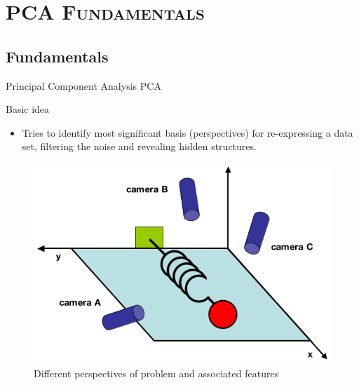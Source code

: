 \documentclass[xcolor=x11names,compress,10pt]{beamer}
\renewcommand{\(}{\begin{columns}}
\renewcommand{\)}{\end{columns}}
\newcommand{\<}[1]{\begin{column}{#1}}
\renewcommand{\>}{\end{column}}
\begin{document}
\section{\scshape PCA Fundamentals}
\subsection{Fundamentals}
\begin{frame}{Principal Component Analysis PCA}
\begin{block}{Basic idea}
\begin{itemize}
	\item Tries to identify most significant basis (perspectives) for re-expressing a data set, filtering the noise and revealing hidden structures.
\end{itemize}

\begin{figure}
	\centering
	\includegraphics[scale=0.2]{../report/resources/images/resorte}
	\caption{Different perspectives of problem and associated features}
	\label{fig:figure1}
\end{figure}
\end{block}
\end{frame}
\end{document}
